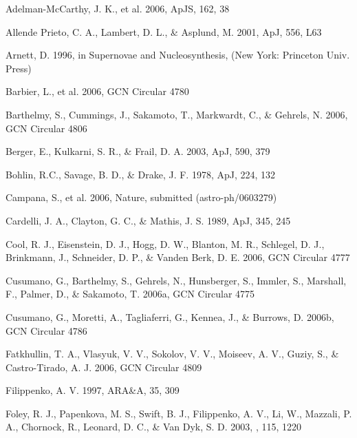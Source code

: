\documentclass[apj]{emulateapj}
\begin{document}
\begin{thebibliography}{99}

 Adelman-McCarthy, J. K.,
et al. 2006, ApJS, 162, 38

 Allende Prieto, C. A., 
Lambert, D. L., \& Asplund, M. 2001, ApJ, 556, L63

Arnett, D. 1996, in Supernovae and Nucleosynthesis,
(New York: Princeton Univ. Press)

 Barbier, L., et al. 2006, GCN Circular 
4780

 Barthelmy, S., Cummings,
J., Sakamoto, T., Markwardt, C., \& Gehrels, N. 2006, GCN Circular 4806

 Berger, E., Kulkarni,
S. R., \& Frail, D. A. 2003, ApJ, 590, 379 

 Bohlin, R.C., Savage, B. D.,
\& Drake, J. F. 1978, ApJ, 224, 132

 Campana, S., et al. 2006, Nature,
submitted (astro-ph/0603279)

 Cardelli, J. A.,
Clayton, G. C., \& Mathis, J. S. 1989, ApJ, 345, 245

 Cool, R. J., Eisenstein, D. J.,
Hogg, D. W., Blanton, M. R., Schlegel, D. J., Brinkmann, J., Schneider,
D. P., \& Vanden Berk, D. E. 2006, GCN Circular 4777

 Cusumano, G., Barthelmy, S., 
Gehrels, N., Hunsberger, S., Immler, S., Marshall, F.,
Palmer, D., \& Sakamoto, T. 2006a, GCN Circular 4775

 Cusumano, G., Moretti, A.,
Tagliaferri, G., Kennea, J., \& Burrows, D. 2006b, GCN Circular 4786

 Fatkhullin, T. A.,
Vlasyuk, V. V., Sokolov, V. V., Moiseev, A. V., Guziy, S.,
\& Castro-Tirado, A. J. 2006, GCN Circular 4809

 Filippenko, A. V. 1997, ARA\&A, 35, 309

 Foley, R. J., Papenkova, M. S., Swift, B. J., Filippenko, A. V., Li, W., Mazzali, P. A., Chornock, R., Leonard, D. C.,
\& Van Dyk, S. D. 2003, \pasp, 115, 1220


\end{thebibliography}
\end{document}
